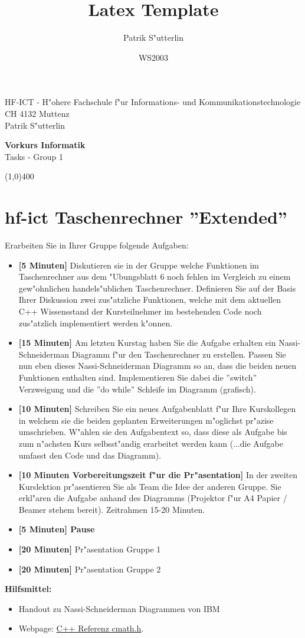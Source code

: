 \documentclass[a4paper,10pt]{article}
\title{Latex Template}
\author{Patrik S"utterlin}
\date{WS2003}
\begin{document}
HF-ICT - H"ohere Fachschule f"ur Informations- und Kommunikationstechnologie\\
CH 4132 Muttenz\\
Patrik S"utterlin

\vspace{2mm}

\begin{center}
{\Large \bf Vorkurs Informatik}\\
Tasks - Group 1
\end{center}

\vspace{2mm}

\line(1,0){400}

\vspace{5mm}

\section{hf-ict Taschenrechner ''Extended''}
Erarbeiten Sie in Ihrer Gruppe folgende Aufgaben:

\begin{itemize}
\item \textbf{[5 Minuten]} Diskutieren sie in der Gruppe welche Funktionen im Taschenrechner aus dem "Ubungsblatt 6 noch fehlen im Vergleich zu einem gew"ohnlichen handels"ublichen Taschenrechner. Definieren Sie auf der Basis Ihrer Diskussion zwei zus"atzliche Funktionen, welche mit dem aktuellen C++ Wissensstand der Kursteilnehmer im bestehenden Code noch zus"atzlich implementiert werden k"onnen.
\item \textbf{[15 Minuten]} Am letzten Kurstag haben Sie die Aufgabe erhalten ein Nassi-Schneiderman Diagramm f"ur den Taschenrechner zu erstellen. Passen Sie nun eben dieses Nassi-Schneiderman Diagramm so an, dass die beiden neuen Funktionen enthalten sind. Implementieren Sie dabei die ''switch'' Verzweigung und die ''do while'' Schleife im Diagramm (grafisch). 
\item \textbf{[10 Minuten]} Schreiben Sie ein neues Aufgabenblatt f"ur Ihre Kurskollegen in welchem sie die beiden geplanten Erweiterungen m"oglichst pr"azise umschrieben. W"ahlen sie den Aufgabentext so, dass diese als Aufgabe bis zum n"achsten Kurs selbsst"andig erarbeitet werden kann (...die Aufgabe umfasst den Code und das Diagramm).
\item \textbf{[10 Minuten Vorbereitungszeit f"ur die Pr"asentation]} In der zweiten Kurslektion pr"asentieren Sie als Team die Idee der anderen Gruppe. Sie erkl"aren die Aufgabe anhand des Diagramms (Projektor f"ur A4 Papier / Beamer stehem bereit). Zeitrahmen 15-20 Minuten.
\item \textbf{[5 Minuten] Pause}
\item \textbf{[20 Minuten]} Pr"asentation Gruppe 1
\item \textbf{[20 Minuten]} Pr"asentation Gruppe 2
\end{itemize}

\textbf{Hilfsmittel:} 

\begin{itemize}
\item Handout zu Nassi-Schneiderman Diagrammen von IBM 
\item Webpage: \href{http://en.cppreference.com/w/cpp/header/cmath}{C++ Referenz cmath.h}.
\end{itemize}
\end{document}

